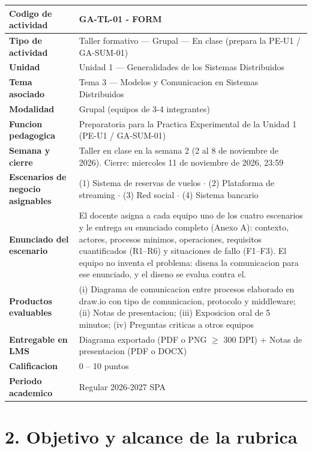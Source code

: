 \documentclass[10pt]{article}
\begin{document}
\renewcommand{\arraystretch}{1.25}
\begin{center}
	\begin{tabular}{|>{\columncolor{uteqLight}\bfseries\color{uteqBlue}}p{5cm}|p{20cm}|}
		\hline
		Codigo de actividad & GA-TL-01 - FORM\\
		\hline
		Tipo de actividad & Taller formativo --- Grupal --- En clase (prepara la PE-U1 / GA-SUM-01)\\
		\hline
		Unidad & Unidad 1 --- Generalidades de los Sistemas Distribuidos\\
		\hline
		Tema asociado & Tema 3 --- Modelos y Comunicacion en Sistemas Distribuidos\\
		\hline
		Modalidad & Grupal (equipos de 3-4 integrantes)\\
		\hline
		Funcion pedagogica & Preparatoria para la Practica Experimental de la Unidad 1 (PE-U1 / GA-SUM-01)\\
		\hline
		Semana y cierre & Taller en clase en la semana 2 (2 al 8 de noviembre de 2026). Cierre: miercoles 11 de noviembre de 2026, 23:59\\
		\hline
		Escenarios de negocio asignables & (1) Sistema de reservas de vuelos $\cdot$ (2) Plataforma de streaming $\cdot$ (3) Red social $\cdot$ (4) Sistema bancario\\
		\hline
		Enunciado del escenario & El docente asigna a cada equipo uno de los cuatro escenarios y le entrega su enunciado completo (Anexo A): contexto, actores, procesos minimos, operaciones, requisitos cuantificados (R1--R6) y situaciones de fallo (F1--F3). El equipo no inventa el problema: disena la comunicacion para ese enunciado, y el diseno se evalua contra el.\\
		\hline
		Productos evaluables & (i) Diagrama de comunicacion entre procesos elaborado en draw.io con tipo de comunicacion, protocolo y middleware; (ii) Notas de presentacion; (iii) Exposicion oral de 5 minutos; (iv) Preguntas criticas a otros equipos\\
		\hline
		Entregable en LMS & Diagrama exportado (PDF o PNG $\geq$ 300 DPI) + Notas de presentacion (PDF o DOCX)\\
		\hline
		Calificacion & 0 -- 10 puntos\\
		\hline
		Periodo academico & Regular 2026-2027 SPA\\
		\hline
	\end{tabular}
\end{center}

\section{2. Objetivo y alcance de la rubrica}
\end{document}
